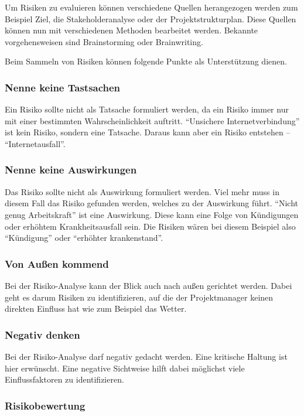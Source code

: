 \documentclass[ThesisDJ.tex]{subfiles}
\begin{document}
Um Risiken zu evaluieren können verschiedene Quellen herangezogen werden zum Beispiel Ziel, die Stakeholderanalyse oder der Projektstrukturplan. Diese Quellen können nun mit verschiedenen Methoden bearbeitet werden. Bekannte vorgehensweisen sind Brainstorming oder Brainwriting.

Beim Sammeln von Risiken können folgende Punkte als Unterstützung dienen.

\subsubsection{Nenne keine Tastsachen}

Ein Risiko sollte nicht als Tatsache formuliert werden, da ein Risiko immer nur mit einer bestimmten Wahrscheinlichkeit auftritt. “Unsichere Internetverbindung” ist kein Risiko, sondern eine Tatsache. Daraus kann aber ein Risiko entstehen – “Internetausfall”.

\subsubsection{Nenne keine Auswirkungen}

Das Risiko sollte nicht als Auswirkung formuliert werden. Viel mehr muss in diesem Fall das Risiko gefunden werden, welches zu der Auswirkung führt. “Nicht genug  Arbeitskraft” ist eine Auswirkung. Diese kann eine Folge von Kündigungen oder erhöhtem Krankheitsausfall sein. Die Risiken wären bei diesem Beispiel also “Kündigung” oder “erhöhter krankenstand”.


\subsubsection{Von Außen kommend}

Bei der Risiko-Analyse kann der Blick auch nach außen gerichtet werden. Dabei geht es darum Risiken zu identifizieren, auf die der Projektmanager keinen direkten Einfluss hat wie zum Beispiel das Wetter. 

\subsubsection{Negativ denken}

Bei der Risiko-Analyse darf negativ gedacht werden. Eine kritische Haltung ist hier erwünscht. Eine negative Sichtweise hilft dabei möglichst viele Einflussfaktoren zu identifizieren.


\subsubsection{Risikobewertung}
\end{document}
